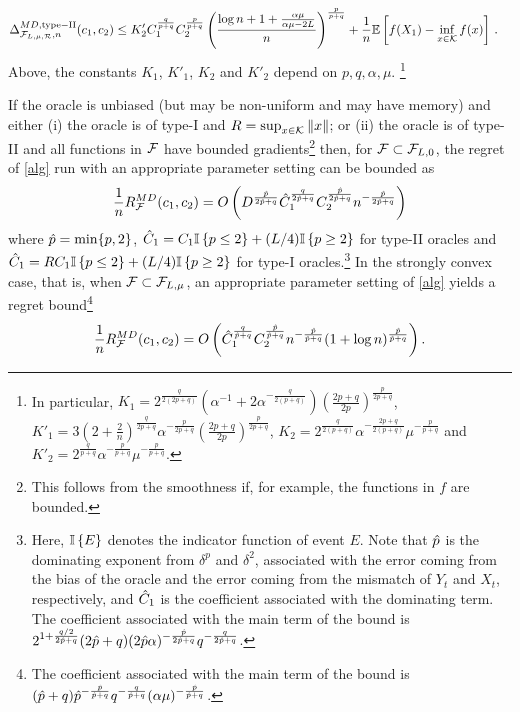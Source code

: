 \begin{theorem}
\begin{align}
\end{align}
\begin{align}
\Delta_{\F_{L,\mu,\cR},n}^{MD, \mathrm{type-II}}(c_1,c_2) 
& %
\leq  K'_2C_1^{\frac{q}{p+q}}C_2^{\frac{p}{p+q}} \left( \frac{\log n+1+\frac{\alpha \mu}{\alpha \mu -2L}}{n} \right)^{\frac{p}{p+q}}  + \frac{1}{n}\EE{f(X_1)-\inf_{x \in \cK}f(x)} 
\,.
\label{eq:MDbound2}
\end{align}
Above,
the constants $K_1$, $K'_1$, $K_2$ and $K'_2$ depend on $p, q, \alpha, \mu$.%
\footnote{
In particular,
$K_1 = 2^{\frac{q}{2(2p+q)}} \left( \alpha^{-1}+2\alpha^{-\frac{q}{2(p+q)}} \right) \left( \frac{2p+q}{2p} \right)^{\frac{p}{2p+q}}$,
$K'_1 = 3 \left(2+\frac{2}{n}\right)^{\frac{q}{2p+q} } \alpha^{-\frac{p}{2p+q}}\left(\frac{2p+q}{2p} \right)^{\frac{p}{2p+q}}$,
$K_2=2^{\frac{q}{2(p+q)}}\alpha^{-\frac{2p+q}{2(p+q)}}\mu^{-\frac{p}{p+q}}$
and
$K'_2=2^{\frac{q}{p+q}}\alpha^{-\frac{p}{p+q}}\mu^{-\frac{p}{p+q}}$.}

If the oracle is unbiased (but may be non-uniform and may have memory) and either
(i) the oracle is of type-I and $R=\sup_{x\in\mathcal{K}} \|x\|$; or (ii) the oracle is of type-II and all functions in $\mathcal{F}$ have bounded gradients\footnote{This follows from the smoothness if, for example, the functions in $f$  are bounded.} then, for $\mathcal{F} \subset \mathcal{F}_{L,0}$, the regret of \cref{alg} run with an appropriate parameter setting can be bounded as
\[
\frac{1}{n} R_{\mathcal{F}}^{MD}(c_1,c_2) = O\left( D^{\frac{\hat{p}}{2\hat{p}+q}} \hat{C}_1^{\frac{q}{2\hat{p}+q}} C_2^{\frac{\hat{p}}{2\hat{p}+q}}  n^{-\frac{\hat{p}}{2\hat{p}+q}} \right)
\]
where $\hat{p}=\min\{p,2\}$, $\hat{C}_1=C_1 \mathbb{I}\left\{p \le 2\right\} + (L/4) \mathbb{I}\left\{p \ge 2\right\}$ for type-II oracles and $\hat{C}_1=R C_1 \mathbb{I}\left\{p \le 2\right\} + (L/4) \mathbb{I}\left\{p \ge 2\right\}$ for type-I oracles.\footnote{Here, $\mathbb{I}\left\{E\right\}$ denotes the indicator function of event $E$. Note that $\hat{p}$ is the dominating exponent from $\delta^p$ and $\delta^2$, associated with the error coming from the bias of the oracle and the error coming from the mismatch of $Y_t$ and $X_t$, respectively, and $\hat{C}_1$ is the coefficient associated with the dominating term. The coefficient associated with the main term of the bound is
$2^{1+\frac{q/2}{2\hat{p}+q}}(2\hat{p}+q) (2\hat{p} \alpha)^{-\frac{\hat{p}}{2\hat{p}+q}} q^{-\frac{q}{2\hat{p}+q}}$.} In the strongly convex case, that is, when $\mathcal{F} \subset \mathcal{F}_{L,\mu}$, an appropriate parameter setting of \cref{alg} yields a regret bound\footnote{
The coefficient associated with the main term of the bound is $(\hat{p}+q)\hat{p}^{-\frac{\hat{p}}{\hat{p}+q}} q^{-\frac{q}{\hat{p}+q}} (\alpha \mu)^{-\frac{\hat{p}}{\hat{p}+q}}$.}
\[
\frac{1}{n} R_{\mathcal{F}}^{MD}(c_1,c_2) = O\left(\hat{C}_1^{\frac{q}{\hat{p}+q}} C_2^{\frac{\hat{p}}{\hat{p}+q}} n^{-\frac{\hat{p}}{\hat{p}+q}} (1+\log n)^{\frac{\hat{p}}{\hat{p}+q}} \right).
\]
\end{theorem}
